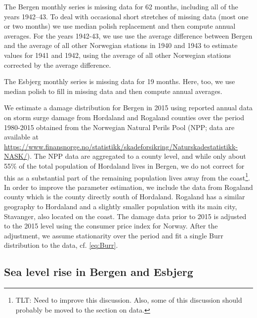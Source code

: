 \documentclass[draft,linenumbers]{agujournal}
\begin{document}
The Bergen monthly series is missing data for 62 months, including all of the years 1942--43. To deal with occasional short stretches of missing data (most one or two months) we use median polish replacement \citep{medpol} and then compute annual averages. For the years 1942-43, we use use the average difference between Bergen and the average of all other Norwegian stations in 1940 and 1943 to estimate values for 1941 and 1942, using the average of all other Norwegian stations corrected by the average difference. 

The Esbjerg monthly series is missing data for 19 months. Here, too, we use median polish to fill in missing data and then compute annual averages.

We estimate a damage distribution for Bergen in 2015 using reported annual data on storm surge damage from Hordaland and Rogaland counties over the period 1980-2015 obtained from the Norwegian Natural Perils Pool (NPP;  data are available at \url{https://www.finansnorge.no/statistikk/skadeforsikring/Naturskadestatistikk-NASK/}). The NPP data are aggregated to a county level, and while only about 55\% of the total population of Hordaland lives in Bergen, we do not correct for this as a substantial part of the remaining population lives away from the coast\footnote{TLT: Need to improve this discussion. Also, some of this discussion should probably be moved to the section on data.}. In order to improve the parameter estimation, we include the data from Rogaland county which is the county directly south of Hordaland. Rogaland has a similar geography to Hordaland and a slightly smaller population with its main city, Stavanger, also located on the coast. The damage data prior to 2015 is adjusted to the 2015 level using the consumer price index for Norway. After the adjustment, we assume stationarity over the period and fit a single Burr distribution to the data, cf. \eqref{eq:Burr}.  
\subsection{Sea level rise in Bergen and Esbjerg}
\end{document}
